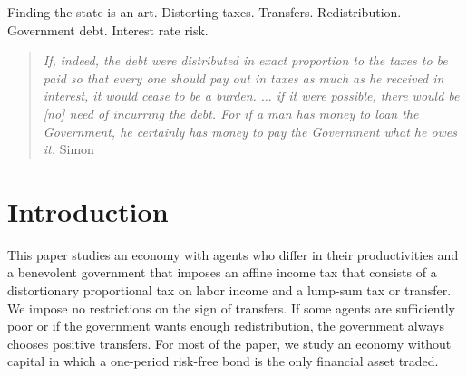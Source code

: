 \documentclass[thmsb,11pt]{article}
\begin{document}
\bigskip
{} Finding the state is an art.  Distorting taxes. Transfers. Redistribution.  Government debt.  Interest rate risk.
\thispagestyle{empty}\bigskip

\bigskip \newpage

\setcounter{page}{1}

\bigskip \baselineskip0.65cm


%




\begin{quote}
\emph{If, indeed, the debt were distributed in exact proportion to the taxes
to be paid so that every one should pay out in taxes as much as he received
in interest, it would cease to be a burden.%
$\ldots$ if it were possible, there
would be [no] need of incurring the debt. For if a man has money to loan the
Government, he certainly has money to pay the Government what he owes it.
}Simon \citet[p.85]{newcomb1865critical}
\end{quote}




\section{Introduction}
%

This paper studies  an economy with  agents who differ in
their productivities and a  benevolent government that imposes an affine income tax that consists of a distortionary proportional
tax on labor income and a lump-sum tax or transfer. We
impose no restrictions on the sign of transfers. If some agents are
sufficiently poor or if the government wants enough redistribution, the
government  always chooses positive transfers.
For most of the paper, we  study an economy without capital in
which  a one-period risk-free bond is the only financial asset traded.
\end{document}
